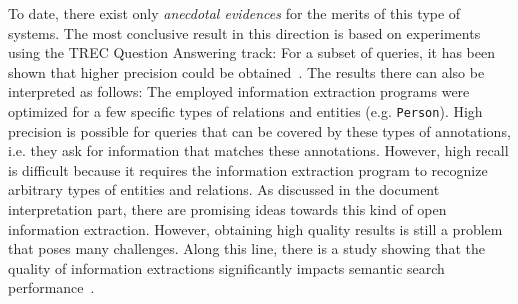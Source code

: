 To date, there exist only \emph{anecdotal evidences} for the merits of this type of systems. 
The most conclusive result in this direction is based on experiments using the TREC Question Answering track: For a subset of queries, it has been shown that higher precision could be obtained~\cite{DBLP:conf/sigir/Chu-CarrollPCFD06}. The results there can also be interpreted as follows: The employed information extraction programs were optimized for a few specific types of relations and entities (e.g. \verb+Person+). High precision is possible for queries that can be covered by these types of annotations, i.e. they ask for information that matches these annotations. However, high recall is difficult because it requires the information extraction program to recognize arbitrary types of entities and relations. As discussed in the document interpretation part, there are promising ideas towards this kind of open information extraction. However, obtaining high quality results is still a problem that poses many challenges. Along this line, there is a study showing that the quality of information extractions significantly impacts semantic search performance~\cite{DBLP:conf/cikm/Chu-CarrollP07}. 

